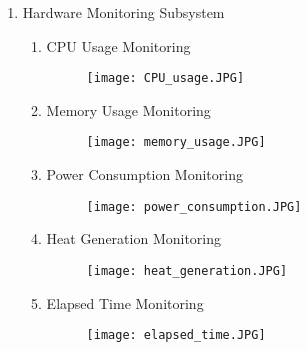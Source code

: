 \documentclass{article}
\begin{document}
\begin{enumerate}
    		\item{Hardware Monitoring Subsystem}
        		\begin{enumerate}
                    \item{CPU Usage Monitoring}
                    \begin{figure}[H]
                    	\centering
                        \texttt{[image: CPU\_usage.JPG]}	
                        \newline
                        \newline
                    \end{figure}
                    
                    \item{Memory Usage Monitoring}
                    \begin{figure}[H]
                    	\centering
                        \texttt{[image: memory\_usage.JPG]}
                        \newline
                        \newline
                    \end{figure}
                    
                    
                    \item{Power Consumption Monitoring}
                    \begin{figure}[H]
                    	\centering
                        \texttt{[image: power\_consumption.JPG]}
                        \newline
                        \newline
                    \end{figure}
                    
                    \item{Heat Generation Monitoring}
                    \begin{figure}[H]
                    	\centering
                        \texttt{[image: heat\_generation.JPG]}
                        \newline
                        \newline
                    \end{figure}
                    
                    \item{Elapsed Time Monitoring}
                    \begin{figure}[H]
                    	\centering
                        \texttt{[image: elapsed\_time.JPG]}
						\newline
                        \newline
                    \end{figure}
                    

\end{enumerate}
\end{enumerate}
\end{document}
